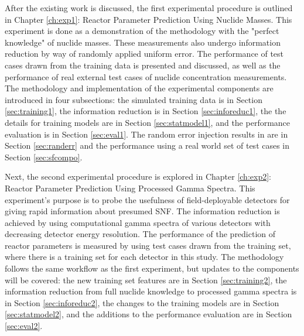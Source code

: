 After the existing work is discussed, the first experimental procedure is
outlined in Chapter \ref{ch:exp1}: Reactor Parameter Prediction Using Nuclide
Masses.  This experiment is done as a demonstration of the methodology with the
"perfect knowledge" of nuclide masses. These measurements also undergo
information reduction by way of randomly applied uniform error. The performance
of test cases drawn from the training data is presented and discussed, as well
as the performance of real external test cases of nuclide concentration
measurements.  The methodology and implementation of the experimental
components are introduced in four subsections: the simulated training data is
in Section \ref{sec:training1}, the information reduction is in Section
\ref{sec:inforeduc1}, the the details for training models are in Section
\ref{sec:statmodel1}, and the performance evaluation is in Section
\ref{sec:eval1}. The random error injection results in are in Section
\ref{sec:randerr} and the performance using a real world set of test cases in
Section \ref{sec:sfcompo}.

Next, the second experimental procedure is explored in Chapter \ref{ch:exp2}:
Reactor Parameter Prediction Using Processed Gamma Spectra.  This experiment's
purpose is to probe the usefulness of field-deployable detectors for giving
rapid information about presumed \gls{SNF}. The information reduction is
achieved by using computational gamma spectra of various detectors with
decreasing detector energy resolution.  The performance of the prediction of
reactor parameters is measured by using test cases drawn from the training set,
where there is a training set for each detector in this study.  The methodology
follows the same workflow as the first experiment, but updates to the
components will be covered: the new training set features are in Section
\ref{sec:training2}, the information reduction from full nuclide knowledge to
processed gamma spectra is in Section \ref{sec:inforeduc2}, the changes to the
training models are in Section \ref{sec:statmodel2}, and the additions to the
performance evaluation are in Section \ref{sec:eval2}.


